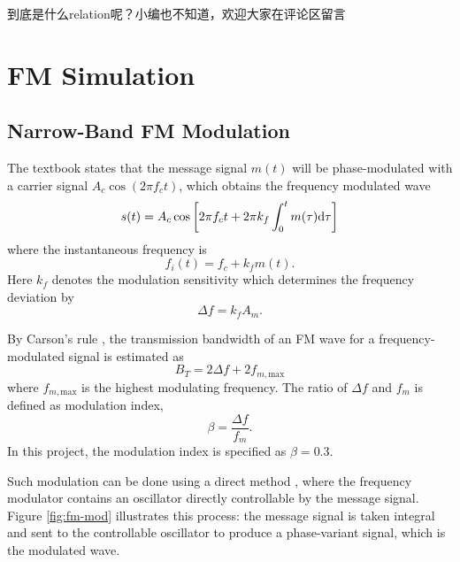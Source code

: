 \documentclass[../ECE459FinalProjectReport.tex]{subfiles}
\begin{document}
到底是什么relation呢？小编也不知道，欢迎大家在评论区留言

\section{FM Simulation}
\subsection{Narrow-Band FM Modulation}
The textbook \cite[Sec. 4.1]{haykinIntroductionAnalogDigital2007} states that the message signal $m(t)$ will be phase-modulated with a carrier signal $A_c \cos\left(2\pi f_c t\right)$, which obtains the frequency modulated wave
\begin{equation}
    \label{eq:fm_modulated}
    s(t) = A_c \cos\left[ 2\pi f_c t + 2\pi k_f \int_0^{t} m(\tau) \mathrm{d}\tau \right]
\end{equation}
where the instantaneous frequency is
\begin{equation}
    f_i(t) = f_c + k_f m(t).
\end{equation}
Here $k_f$ denotes the modulation sensitivity which determines the frequency deviation by
\begin{equation}
    \Delta f = k_f A_m.
\end{equation}

By Carson's rule \cites[Sec. 4.6]{haykinIntroductionAnalogDigital2007}{CarsonRule2017}, the transmission bandwidth of an FM wave for a frequency-modulated signal is estimated as
\begin{equation}
    B_T = 2\Delta f + 2f_{m,\mathrm{max}}
\end{equation}
where $f_{m,\mathrm{max}}$ is the highest modulating frequency. The ratio of $\Delta f$ and $f_m$ is defined as modulation index,
\begin{equation}
    \beta = \frac{\Delta f}{f_m}.
\end{equation}
In this project, the modulation index is specified as $\beta=0.3$.

Such modulation can be done using a direct method \cite[Sec. 4.7]{haykinIntroductionAnalogDigital2007}, where the frequency modulator contains an oscillator directly controllable by the message signal. Figure \ref{fig:fm-mod} illustrates this process: the message signal is taken integral and sent to the controllable oscillator to produce a phase-variant signal, which is the modulated wave.
\end{document}
